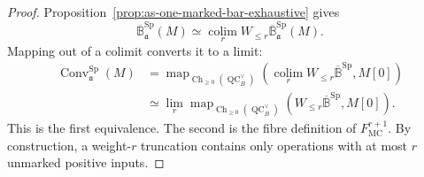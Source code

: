 \begin{proof}
Proposition~\ref{prop:as-one-marked-bar-exhaustive} gives
\[
    \overline{\mathbb B}^{\mathrm{Sp}}_{\mathfrak a}(M)
    \simeq
    \operatorname*{colim}_r
    W_{\le r}
    \overline{\mathbb B}^{\mathrm{Sp}}_{\mathfrak a}(M).
\]
Mapping out of a colimit converts it to a limit:
\[
\begin{aligned}
\operatorname{Conv}^{\mathrm{Sp}}_{\mathfrak a}(M)
&=
\operatorname{map}_{\operatorname{Ch}_{\geq0}(\operatorname{QC}^{\vee}_B)}
\left(
    \operatorname*{colim}_r
    W_{\le r}\overline{\mathbb B}^{\mathrm{Sp}},
    M[0]
\right)\\
&\simeq
\lim_r
\operatorname{map}_{\operatorname{Ch}_{\geq0}(\operatorname{QC}^{\vee}_B)}
\left(
    W_{\le r}\overline{\mathbb B}^{\mathrm{Sp}},
    M[0]
\right).
\end{aligned}
\]
This is the first equivalence.  The second is the fibre definition of
$F_{\mathrm{MC}}^{r+1}$.  By construction, a weight-$r$ truncation contains
only operations with at most $r$ unmarked positive inputs.
\end{proof}

